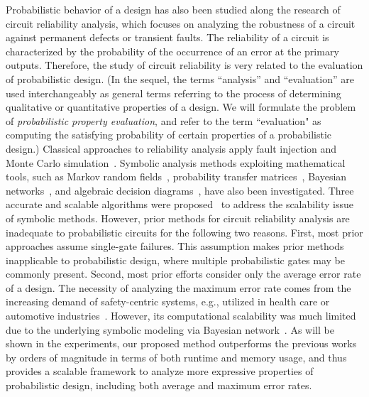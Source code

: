     Probabilistic behavior of a design has also been studied along the research of circuit reliability analysis, which focuses on analyzing the robustness of a circuit against permanent defects or transient faults.
    The reliability of a circuit is characterized by the probability of the occurrence of an error at the primary outputs.
    Therefore, the study of circuit reliability is very related to the evaluation of probabilistic design.
    (In the sequel, the terms ``analysis'' and ``evaluation'' are used interchangeably as general terms referring to the process of determining qualitative or quantitative properties of a design.
    We will formulate the problem of \textit{probabilistic property evaluation}, and refer to the term ``evaluation" as computing the satisfying probability of certain properties of a probabilistic design.)
    Classical approaches to reliability analysis apply fault injection and Monte Carlo simulation~\cite{Mohanram2003}.
    Symbolic analysis methods exploiting mathematical tools, such as Markov random fields~\cite{Bahar2003}, probability transfer matrices~\cite{Krishnaswamy2005}, Bayesian networks~\cite{Rejimon2005}, and algebraic decision diagrams~\cite{Miskov-Zivanov2006}, have also been investigated.
    Three accurate and scalable algorithms were proposed~\cite{Choudhury2009} to address the scalability issue of symbolic methods.
    However, prior methods for circuit reliability analysis are inadequate to probabilistic circuits for the following two reasons.
    First, most prior approaches assume single-gate failures.
    This assumption makes prior methods inapplicable to probabilistic design, where multiple probabilistic gates may be commonly present.
    Second, most prior efforts consider only the average error rate of a design.
    The necessity of analyzing the maximum error rate comes from the increasing demand of safety-centric systems, e.g., utilized in health care or automotive industries~\cite{Lingasubramanian2007,Lingasubramanian2011}.
    However, its computational scalability was much limited due to the underlying symbolic modeling via Bayesian network~\cite{Jensen1996}.
    As will be shown in the experiments, our proposed method outperforms the previous works~\cite{Lingasubramanian2007,Lingasubramanian2011} by orders of magnitude in terms of both runtime and memory usage, and thus provides a scalable framework to analyze more expressive properties of probabilistic design, including both average and maximum error rates.

